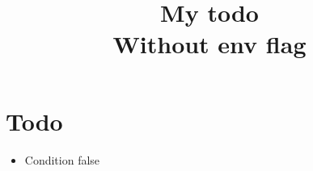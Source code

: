 \documentclass{article}
\title{
  My todo\\\large{
    Without env flag
  }
}
\begin{document}
\maketitle


\section{Todo}
\begin{itemize}
  \item Condition false
\end{itemize}


\end{document}
